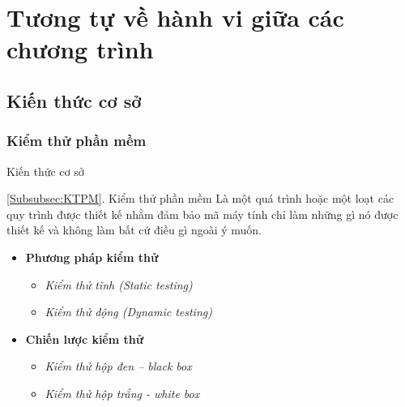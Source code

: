 \section{Tương tự về hành vi giữa các chương trình}
\label{sec:TTVHV}
\subsection{Kiến thức cơ sở}
\label{subsec:KTCS}
\subsubsection*{Kiểm thử phần mềm}
\label{Subsubsec:KTPM}
\begin{frame}{Kiến thức cơ sở}
\begin{block}{\ref{Subsubsec:KTPM}. Kiểm thử phần mềm}
Là một quá trình hoặc một loạt các quy trình được thiết kế nhằm đảm bảo mã 
máy tính chỉ làm những gì nó được thiết kế và không làm bất cứ điều gì ngoài ý muốn.
\end{block} \pause
\begin{itemize}
	\item \textbf{Phương pháp kiểm thử} 
	\begin{itemize}	
		\item \textit{Kiểm thử tĩnh (Static testing)} 			
		\item \textit{Kiểm thử động (Dynamic testing) }
		\pause
	\end{itemize}
	\item \textbf{Chiến lược kiểm thử }
	\begin{itemize}	
		\item \textit{Kiểm thử hộp đen – black box} 
		\item \textit{Kiểm thử hộp trắng - white box }
	\end{itemize}
\end{itemize}	
\end{frame}

